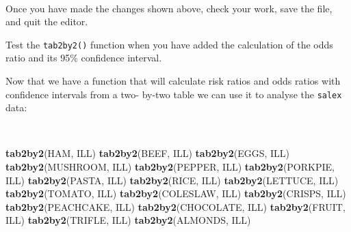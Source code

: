 \documentclass[12pt,a4paper]{book}
\newenvironment{Shaded}{\begin{snugshade}}{\end{snugshade}}
\newcommand{\CharTok}[1]{\textcolor[rgb]{0.31,0.60,0.02}{#1}}
\newcommand{\KeywordTok}[1]{\textcolor[rgb]{0.13,0.29,0.53}{\textbf{#1}}}
\newcommand{\NormalTok}[1]{#1}
\newcommand{\OperatorTok}[1]{\textcolor[rgb]{0.81,0.36,0.00}{\textbf{#1}}}
\newcommand{\StringTok}[1]{\textcolor[rgb]{0.31,0.60,0.02}{#1}}
\theoremstyle{definition}
\theoremstyle{definition}
\theoremstyle{definition}
\theoremstyle{remark}
\begin{document}
\begin{Shaded}
\end{Shaded}

~

Once you have made the changes shown above, check your work, save the
file, and quit the editor.

\newpage

Test the \texttt{tab2by2()} function when you have added the calculation
of the odds ratio and its 95\% confidence interval.

Now that we have a function that will calculate risk ratios and odds
ratios with confidence intervals from a two- by-two table we can use it
to analyse the \texttt{salex} data:

~

\begin{Shaded}
\begin{Highlighting}[]
\KeywordTok{tab2by2}\NormalTok{(HAM, ILL)}
\KeywordTok{tab2by2}\NormalTok{(BEEF, ILL)}
\KeywordTok{tab2by2}\NormalTok{(EGGS, ILL)}
\KeywordTok{tab2by2}\NormalTok{(MUSHROOM, ILL)}
\KeywordTok{tab2by2}\NormalTok{(PEPPER, ILL)}
\KeywordTok{tab2by2}\NormalTok{(PORKPIE, ILL)}
\KeywordTok{tab2by2}\NormalTok{(PASTA, ILL)}
\KeywordTok{tab2by2}\NormalTok{(RICE, ILL)}
\KeywordTok{tab2by2}\NormalTok{(LETTUCE, ILL)}
\KeywordTok{tab2by2}\NormalTok{(TOMATO, ILL)}
\KeywordTok{tab2by2}\NormalTok{(COLESLAW, ILL)}
\KeywordTok{tab2by2}\NormalTok{(CRISPS, ILL)}
\KeywordTok{tab2by2}\NormalTok{(PEACHCAKE, ILL)}
\KeywordTok{tab2by2}\NormalTok{(CHOCOLATE, ILL)}
\KeywordTok{tab2by2}\NormalTok{(FRUIT, ILL)}
\KeywordTok{tab2by2}\NormalTok{(TRIFLE, ILL)}
\KeywordTok{tab2by2}\NormalTok{(ALMONDS, ILL)}
\end{Highlighting}
\end{Shaded}
\end{document}
